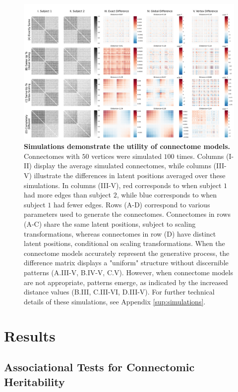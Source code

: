\begin{figure}
    \centering
    \includegraphics[width=\linewidth]{figures/herit/3-simulations.pdf}
    \caption{\textbf{Simulations demonstrate the utility of connectome models.} Connectomes with $50$ vertices were simulated $100$ times. Columns (I-II) display the average simulated connectomes, while columns {(III-V)} illustrate the differences in latent positions averaged over these simulations. In columns (III-V), red corresponds to when subject $1$ had more edges than subject $2$, while blue corresponds to when subject $1$ had fewer edges. Rows (A-D) correspond to various parameters used to generate the connectomes. Connectomes in rows (A-C) share the same latent positions, subject to scaling transformations, whereas connectomes in row (D) have distinct latent positions, conditional on scaling transformations. When the connectome models accurately represent the generative process, the difference matrix displays a "uniform" structure without discernible patterns (A.III-V, B.IV-V, C.V). However, when connectome models are not appropriate, patterns emerge, as indicated by the increased distance values (B.III, C.III-VI, D.III-V).
    For further technical details of these simulations, see Appendix \ref{sup:simulations}.}
    \label{fig:simulations}
\end{figure} 

\section{Results}

\subsection{Associational Tests for Connectomic Heritability} 

